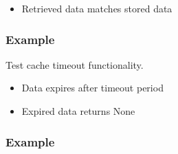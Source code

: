 \documentclass[letterpaper,10pt,english]{sphinxmanual}
\begin{document}
\begin{fulllineitems}
\begin{fulllineitems}
\begin{description}
\begin{itemize}
\item {} 
\sphinxAtStartPar
Retrieved data matches stored data

\end{itemize}

\end{description}
\subsubsection*{Example}

\begin{sphinxVerbatim}[commandchars=\\\{\}]
  
\end{sphinxVerbatim}

\end{fulllineitems}


\begin{fulllineitems}
\label{\detokenize{pages_app.tests:pages_app.tests.test_cache.CacheTests.test_cache_timeout}}
\pysigstartsignatures
\pysiglinewithargsret
{}
{}
{}
\pysigstopsignatures
\sphinxAtStartPar
Test cache timeout functionality.
\begin{description}
\begin{itemize}
\item {} 
\sphinxAtStartPar
Data expires after timeout period

\item {} 
\sphinxAtStartPar
Expired data returns None

\end{itemize}

\end{description}
\subsubsection*{Example}


\end{fulllineitems}
\end{fulllineitems}
\end{document}
